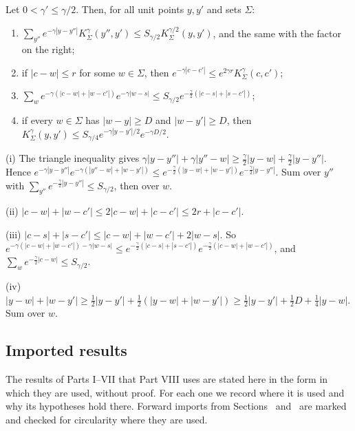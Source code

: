 \begin{detail}\label{d8:seam}
Let $0<\gamma'\le\gamma/2$. Then, for all unit points $y,y'$ and sets $\Sigma$:
\begin{enumerate}[label=(\roman*)]
\item $\sum_{y''}e^{-\gamma|y-y''|}K^\gamma_\Sigma(y'',y')\le S_{\gamma/2}K^{\gamma/2}_\Sigma(y,y')$, and the same with the factor on the right;
\item if $|c-w|\le r$ for some $w\in\Sigma$, then $e^{-\gamma|c-c'|}\le e^{2\gamma r}K^\gamma_\Sigma(c,c')$;
\item $\sum_we^{-\gamma(|c-w|+|w-c'|)}e^{-\gamma|w-s|}\le S_{\gamma/2}e^{-\frac\gamma2(|c-s|+|s-c'|)}$;
\item if every $w\in\Sigma$ has $|w-y|\ge D$ and $|w-y'|\ge D$, then $K^\gamma_\Sigma(y,y')\le S_{\gamma/4}e^{-\gamma|y-y'|/2}e^{-\gamma D/2}$.
\end{enumerate}
\begin{step}
(i) The triangle inequality gives $\gamma|y-y''|+\gamma|y''-w|\ge\frac\gamma2|y-w|+\frac\gamma2|y-y''|$. Hence $e^{-\gamma|y-y''|}e^{-\gamma(|y''-w|+|w-y'|)}\le e^{-\frac\gamma2(|y-w|+|w-y'|)}e^{-\frac\gamma2|y-y''|}$. Sum over $y''$ with $\sum_{y''}e^{-\frac\gamma2|y-y''|}\le S_{\gamma/2}$, then over $w$.
\end{step}
\begin{step}
(ii) $|c-w|+|w-c'|\le2|c-w|+|c-c'|\le2r+|c-c'|$.
\end{step}
\begin{step}
(iii) $|c-s|+|s-c'|\le|c-w|+|w-c'|+2|w-s|$. So $e^{-\gamma(|c-w|+|w-c'|)-\gamma|w-s|}\le e^{-\frac\gamma2(|c-s|+|s-c'|)}e^{-\frac\gamma2(|c-w|+|w-c'|)}$, and $\sum_we^{-\frac\gamma2|c-w|}\le S_{\gamma/2}$.
\end{step}
\begin{step}
(iv) $|y-w|+|w-y'|\ge\frac12|y-y'|+\frac12(|y-w|+|w-y'|)\ge\frac12|y-y'|+\frac12D+\frac14|y-w|$. Sum over $w$.
\end{step}
\end{detail}

\subsection{Imported results}\label{d8:imports}

The results of Parts I--VII that Part VIII uses are stated here in the form in which they are used, without proof. For each one we record where it is used and why its hypotheses hold there. Forward imports from Sections~ and~ are marked and checked for circularity where they are used.

